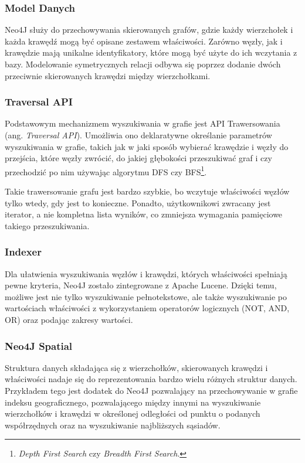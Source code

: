 \subsubsection*{Model Danych}

Neo4J służy do przechowywania skierowanych grafów, gdzie każdy wierzchołek i każda krawędź mogą być opisane zestawem właściwości.
Zarówno węzły, jak i krawędzie mają unikalne identyfikatory, które mogą być użyte do ich wczytania z bazy.
Modelowanie symetrycznych relacji odbywa się poprzez dodanie dwóch przeciwnie skierowanych krawędzi między wierzchołkami.

\subsubsection*{Traversal API}

Podstawowym mechanizmem wyszukiwania w grafie jest API Trawersowania (ang. \emph{Traversal API}).
Umożliwia ono deklaratywne określanie parametrów wyszukiwania w grafie, takich jak w jaki sposób wybierać krawędzie i węzły do przejścia, które węzły zwrócić, do jakiej głębokości przeszukiwać graf i czy przechodzić po nim używając algorytmu DFS czy BFS\footnote{\emph{Depth First Search} czy \emph{Breadth First Search}.}.

Takie trawersowanie grafu jest bardzo szybkie, bo wczytuje właściwości węzłów tylko wtedy, gdy jest to konieczne.
Ponadto, użytkownikowi zwracany jest iterator, a nie kompletna lista wyników, co zmniejsza wymagania pamięciowe takiego przeszukiwania.

\subsubsection*{Indexer}

Dla ułatwienia wyszukiwania węzłów i krawędzi, których właściwości spełniają pewne kryteria, Neo4J zostało zintegrowane z Apache Lucene.
Dzięki temu, możliwe jest nie tylko wyszukiwanie pełnotekstowe, ale także wyszukiwanie po wartościach właściwości z wykorzystaniem operatorów logicznych (NOT, AND, OR) oraz podając zakresy wartości.

\subsubsection*{Neo4J Spatial}

Struktura danych składająca się z wierzchołków, skierowanych krawędzi i właściwości nadaje się do reprezentowania bardzo wielu różnych struktur danych.
Przykładem tego jest dodatek do Neo4J pozwalający na przechowywanie w grafie indeksu geograficznego, pozwalającego między innymi na wyszukiwanie wierzchołków i krawędzi w określonej odległości od punktu o podanych współrzędnych oraz na wyszukiwanie najbliższych sąsiadów.

